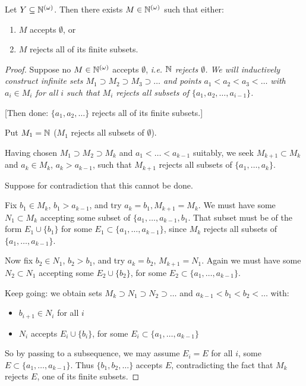 \documentclass[10pt]{article}
\newcommand{\bom}{{(\omega)}}
\begin{document}
\begin{lemma}
    Let $Y \subset \N^\bom$. Then there exists $M \in \N^\bom$ such that either:
    \begin{enumerate}[label = \roman*)]
        \item $M$ accepts $\emptyset$, or
        \item $M$ rejects all of its finite subsets.
    \end{enumerate}
\end{lemma}
\begin{proof}
    Suppose no $M \in \N^\bom$ accepts $\emptyset$, \it{i.e.} $\mathbb{N}$ rejects $\emptyset$. We will inductively construct infinite sets $M_1\supset M_2 \supset M_3 \supset\dots$ and points $a_1 < a_2 < a_3 <\dots$ with $a_i \in M_i$ for all $i$ such that $M_i$ rejects all subsets of $\{a_1,a_2,\dots,a_{i-1}\}$.

    [Then done: $\{a_1,a_2,\dots\}$ rejects all of its finite subsets.]

    Put $M_1 = \mathbb{N}$ ($M_1$ rejects all subsets of $\emptyset$).

    Having chosen $M_1\supset M_2\supset M_k$ and $a_1 < \dots < a_{k-1}$ suitably, we seek $M_{k+1}\subset M_k$ and $a_k \in M_k$, $a_k > a_{k-1}$, such that $M_{k+1}$ rejects all subsets of $\{a_1,\dots,a_{k}\}$.

    Suppose for contradiction that this cannot be done.

    Fix $b_1\in M_k$, $b_1 > a_{k-1}$, and try $a_k = b_1, M_{k+1} = M_k$. We must have some $N_1 \subset M_k$ accepting some subset of $\{a_1,\dots,a_{k-1},b_1$. That subset must be of the form $E_1 \cup \{b_1\}$ for some $E_1 \subset \{a_1,\dots,a_{k-1}\}$, since $M_k$ rejects all subsets of $\{a_1,\dots,a_{k-1}\}$.

    Now fix $b_2 \in N_1$, $b_2 > b_1$, and try $a_k = b_2$, $M_{k+1} = N_1$. Again we must have some $N_2 \subset N_1$ accepting some $E_2 \cup \{b_2\}$, for some $E_2 \subset \{a_1,\dots,a_{k-1}\}$.

    Keep going: we obtain sets $M_k \supset N_1 \supset N_2\supset \dots$ and $a_{k-1} < b_1 < b_2 < \dots $ with:
    \begin{itemize}
        \item $b_{i+1} \in N_i$ for all $i$
        \item $N_i$ accepts $E_i \cup \{b_i\}$, for some $E_i \subset \{a_1,\dots,a_{k-1}\}$
    \end{itemize}
    So by passing to a subsequence, we may assume $E_i = E$ for all $i$, some $E\subset \{a_1,\dots,a_{k-1}\}$. Thus $\{b_1,b_2,\dots\}$ accepts $E$, contradicting the fact that $M_k$ rejects $E$, one of its finite subsets.
\end{proof}
\end{document}
